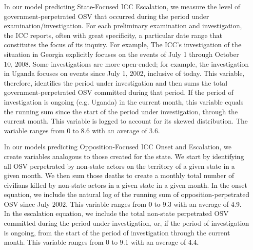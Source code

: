 In our model predicting State-Focused ICC Escalation, we measure the level of government-perpetrated OSV that occurred during the period under examination/investigation.  For each preliminary examination and investigation, the ICC reports, often with great specificity, a particular date range that constitutes the focus of its inquiry.  For example, The ICC’s investigation of the situation in Georgia explicitly focuses on the events of July 1 through October 10, 2008.  Some investigations are more open-ended; for example, the investigation in Uganda focuses on events since July 1, 2002, inclusive of today.  This variable, therefore, identifies the period under investigation and then sums the total government-perpetrated OSV committed during that period.  If the period of investigation is ongoing (e.g. Uganda) in the current month, this variable equals the running sum since the start of the period under investigation, through the current month.  This variable is logged to account for its skewed distribution.  The variable ranges from 0 to 8.6 with an average of 3.6.   

In our models predicting Opposition-Focused ICC Onset and Escalation, we create variables analogous to those created for the state.  We start by identifying all OSV perpetrated by non-state actors on the territory of a given state in a given month.  We then sum those deaths to create a monthly total number of civilians killed by non-state actors in a given state in a given month.  In the onset equation, we include the natural log of the running sum of opposition-perpetrated OSV since July 2002.  This variable ranges from 0 to 9.3 with an average of 4.9.  In the escalation equation, we include the total non-state perpetrated OSV committed during the period under investigation, or, if the period of investigation is ongoing, from the start of the period of investigation through the current month.  This variable ranges from 0 to 9.1 with an average of 4.4.


